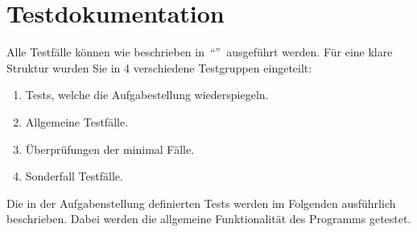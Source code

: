 \chapter{Testdokumentation}\label{ch:testdokumentation}
Alle Testfälle können wie beschrieben in~\enquote{}~ausgeführt werden.
Für eine klare Struktur wurden Sie in 4 verschiedene Testgruppen eingeteilt:
\begin{enumerate}[label={\textbf{Gruppe~\arabic*:}}, ref={Gruppe~\arabic*}, leftmargin=*, noitemsep]
    \label{enm:tesgruppen}
    \item Tests, welche die Aufgabestellung wiederspiegeln.
    \item Allgemeine Testfälle.
    \item Überprüfungen der minimal Fälle.
    \item Sonderfall Testfälle.
\end{enumerate}

Die in der Aufgabenstellung definierten Tests werden im Folgenden ausführlich beschrieben.
Dabei werden die allgemeine Funktionalität des Programms getestet.

